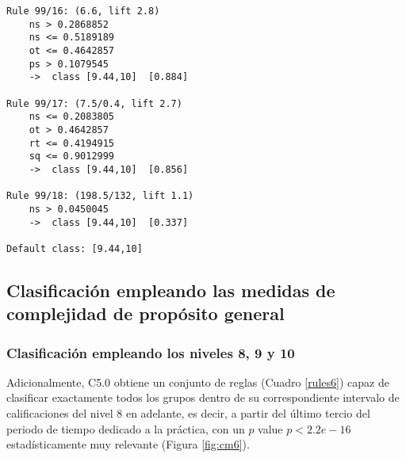 \begin{tcolorbox}[title=Reglas de clasificación para identificar intervalos de notas.]
\begin{multicols}{3}
\begin{verbatim}
Rule 99/16: (6.6, lift 2.8)
	ns > 0.2868852
	ns <= 0.5189189
	ot <= 0.4642857
	ps > 0.1079545
	->  class [9.44,10]  [0.884]

Rule 99/17: (7.5/0.4, lift 2.7)
	ns <= 0.2083805
	ot > 0.4642857
	rt <= 0.4194915
	sq <= 0.9012999
	->  class [9.44,10]  [0.856]

Rule 99/18: (198.5/132, lift 1.1)
	ns > 0.0450045
	->  class [9.44,10]  [0.337]
	
Default class: [9.44,10]
    \end{verbatim}
  \end{multicols}
\label{rulesbegin2}
\end{tcolorbox}

\subsection{Clasificación empleando las medidas de complejidad de propósito general}

\subsubsection{Clasificación empleando los niveles 8, 9 y 10}

Adicionalmente, C5.0 obtiene un conjunto de reglas (Cuadro \ref{rules6}) capaz de clasificar exactamente todos los grupos dentro de su correspondiente intervalo de calificaciones del nivel $8$ en adelante, es decir, a partir del último tercio del periodo de tiempo dedicado a la práctica, con un $p$ value $p < 2.2e-16$ estadísticamente muy relevante (Figura \ref{fig:cm6}).

